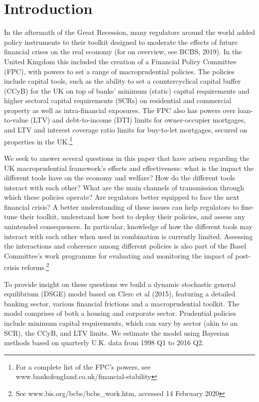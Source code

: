 \documentclass[12pt]{article}
\numberwithin{equation}{section}
\begin{document}
\section{Introduction}

In the aftermath of the Great Recession, many regulators around the world added policy instruments to their toolkit designed to moderate the effects of future financial crises on the real economy (for on overview, see BCBS, 2019). In the United Kingdom this included the creation of a Financial Policy Committee (FPC), with powers to set a range of macroprudential policies. The policies include capital tools, such as the ability to set a countercyclical capital buffer (CCyB) for the UK on top of banks’ minimum (static) capital requirements and higher sectoral capital requirements (SCRs) on residential and commercial property as well as intra-financial exposures. The FPC also has powers over loan-to-value (LTV) and debt-to-income (DTI) limits for owner-occupier mortgages, and LTV and interest coverage ratio limits for buy-to-let mortgages, secured on properties in the UK.\footnote{For a complete list of the FPC’s powers, see www.bankofengland.co.uk/financial-stability}

We seek to answer several questions in this paper that have arisen regarding the UK macroprudential framework’s effects and effectiveness: what is the impact the different tools have on the economy and welfare? How do the different tools interact with each other? What are the main channels of transmission through which these policies operate? Are regulators better equipped to face the next financial crisis? A better understanding of these issues can help regulators to fine-tune their toolkit, understand how best to deploy their policies, and assess any unintended consequences. In particular, knowledge of how the different tools may interact with each other when used in combination is currently limited. Assessing the interactions and coherence among different policies is also part of the Basel Committee’s work programme for evaluating and monitoring the impact of post-crisis reforms.\footnote{See www.bis.org/bcbs/bcbs\_work.htm, accessed 14 February 2020}

To provide insight on these questions we build a dynamic stochastic general equilibrium (DSGE) model based on Clerc et al (2015), featuring a detailed banking sector, various financial frictions and a macroprudential toolkit. The model comprises of both a housing and corporate sector. Prudential policies include minimum capital requirements, which can vary by sector (akin to an SCR), the CCyB, and LTV limits. We estimate the model using Bayesian methods based on quarterly U.K. data from 1998 Q1 to 2016 Q2.
\end{document}
